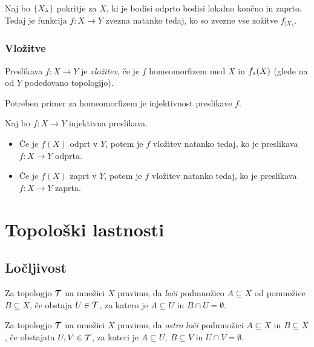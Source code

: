 \begin{posledica}
    Naj bo $\left\{X_\lambda\right\}$ pokritje za $X$, ki je bodisi odprto bodisi lokalno končno in zaprto. Tedaj je funkcija $f: X \to Y$ zvezna natanko tedaj, ko so zvezne vse zožitve $f_{|X_\lambda}$.
\end{posledica}

\subsubsection{Vložitve}
\begin{definicija}
    Preslikava $f: X \to Y$ je \emph{vložitev}, če je $f$ homeomorfizem med $X$ in $f_{*}(X)$ (glede na od $Y$ podedovano topologijo).
\end{definicija}

\begin{opomba}
    Potreben primer za homeomorfizem je injektivnost preslikave $f$. 
\end{opomba}

\begin{trditev}
    Naj bo $f: X \to Y$ injektivna preslikava.
    \begin{itemize}
        \item Če je $f(X)$ odprt v $Y$, potem je $f$ vložitev natanko tedaj, ko je preslikava $f: X \to Y$ odprta.
        \item Če je $f(X)$ zaprt v $Y$, potem je $f$ vložitev natanko tedaj, ko je preslikava $f: X \to Y$ zaprta.
    \end{itemize}
\end{trditev}

\section{Topološki lastnosti}
\subsection{Ločljivost}
\begin{definicija}
    Za topologjo $\mathcal{T}$ na množici $X$ pravimo, da \emph{loči} podmnožico $A \subseteq X$ od pomnožice $B \subseteq X$, če obstaja $U \in \mathcal{T}$, za katero je $A \subseteq U$ in $B \cap U = \emptyset$.
\end{definicija}

\begin{definicija}
    Za topologjo $\mathcal{T}$ na množici $X$ pravimo, da \emph{ostro loči} podmnožici $A \subseteq X$ in $B \subseteq X$, če obstajata $U, V \in \mathcal{T}$, za kateri je $A \subseteq U, \ B \subseteq V$ in $U \cap V = \emptyset$.
\end{definicija}

